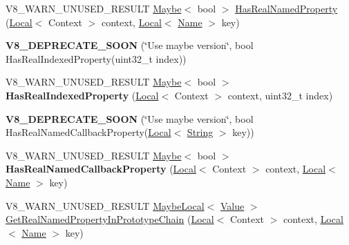 \begin{DoxyCompactItemize}
\item 
V8\+\_\+\+W\+A\+R\+N\+\_\+\+U\+N\+U\+S\+E\+D\+\_\+\+R\+E\+S\+U\+LT \mbox{\hyperlink{classv8_1_1Maybe}{Maybe}}$<$ bool $>$ \mbox{\hyperlink{classv8_1_1Object_ad830b937c7586fe2086b288ea79935c4}{Has\+Real\+Named\+Property}} (\mbox{\hyperlink{classv8_1_1Local}{Local}}$<$ Context $>$ context, \mbox{\hyperlink{classv8_1_1Local}{Local}}$<$ \mbox{\hyperlink{classv8_1_1Name}{Name}} $>$ key)
\item 
\mbox{\label{classv8_1_1Object_abd04e5cb82426a70ebea6afec8687c9e}} 
{\bfseries V8\+\_\+\+D\+E\+P\+R\+E\+C\+A\+T\+E\+\_\+\+S\+O\+ON} (\char`\"{}Use maybe version\char`\"{}, bool Has\+Real\+Indexed\+Property(uint32\+\_\+t index))
\item 
\mbox{\label{classv8_1_1Object_a46de2f348f4caafca287328ce385ab56}} 
V8\+\_\+\+W\+A\+R\+N\+\_\+\+U\+N\+U\+S\+E\+D\+\_\+\+R\+E\+S\+U\+LT \mbox{\hyperlink{classv8_1_1Maybe}{Maybe}}$<$ bool $>$ {\bfseries Has\+Real\+Indexed\+Property} (\mbox{\hyperlink{classv8_1_1Local}{Local}}$<$ Context $>$ context, uint32\+\_\+t index)
\item 
\mbox{\label{classv8_1_1Object_ae1ffb11a0fa7549652d0530c0c4c4ca6}} 
{\bfseries V8\+\_\+\+D\+E\+P\+R\+E\+C\+A\+T\+E\+\_\+\+S\+O\+ON} (\char`\"{}Use maybe version\char`\"{}, bool Has\+Real\+Named\+Callback\+Property(\mbox{\hyperlink{classv8_1_1Local}{Local}}$<$ \mbox{\hyperlink{classv8_1_1String}{String}} $>$ key))
\item 
\mbox{\label{classv8_1_1Object_a62bde6bea1ce32b30b2152f33a105b14}} 
V8\+\_\+\+W\+A\+R\+N\+\_\+\+U\+N\+U\+S\+E\+D\+\_\+\+R\+E\+S\+U\+LT \mbox{\hyperlink{classv8_1_1Maybe}{Maybe}}$<$ bool $>$ {\bfseries Has\+Real\+Named\+Callback\+Property} (\mbox{\hyperlink{classv8_1_1Local}{Local}}$<$ Context $>$ context, \mbox{\hyperlink{classv8_1_1Local}{Local}}$<$ \mbox{\hyperlink{classv8_1_1Name}{Name}} $>$ key)
\item 
V8\+\_\+\+W\+A\+R\+N\+\_\+\+U\+N\+U\+S\+E\+D\+\_\+\+R\+E\+S\+U\+LT \mbox{\hyperlink{classv8_1_1MaybeLocal}{Maybe\+Local}}$<$ \mbox{\hyperlink{classv8_1_1Value}{Value}} $>$ \mbox{\hyperlink{classv8_1_1Object_afe68d490fc41783e30126ca547b7fc90}{Get\+Real\+Named\+Property\+In\+Prototype\+Chain}} (\mbox{\hyperlink{classv8_1_1Local}{Local}}$<$ Context $>$ context, \mbox{\hyperlink{classv8_1_1Local}{Local}}$<$ \mbox{\hyperlink{classv8_1_1Name}{Name}} $>$ key)

\end{DoxyCompactItemize}
